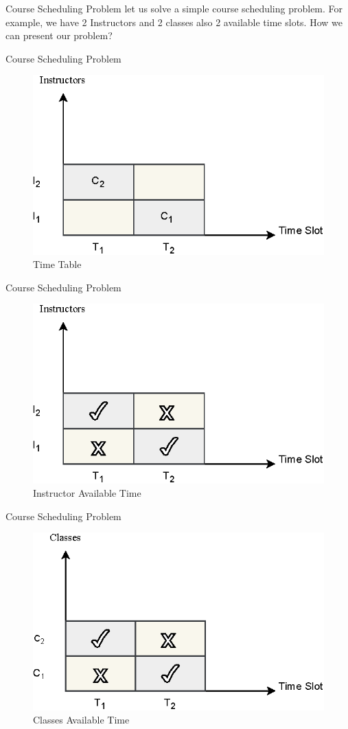 \documentclass[14pt, aspectratio=169]{beamer}
\begin{document}
\begin{frame}{Course Scheduling Problem}
    let us solve a simple course scheduling problem. For example, we have 2 Instructors and 2 classes also 2 available time slots. How we can present our problem?
\end{frame}

\begin{frame}{Course Scheduling Problem}
    \begin{figure}
        \centering
        \includegraphics[width=0.65\linewidth]{Table1.eps}
        \caption{Time Table}
        \label{fig:enter-label}
    \end{figure}
\end{frame}


\begin{frame}{Course Scheduling Problem}
    \begin{figure}
        \centering
        \includegraphics[width=0.65\linewidth]{Table2.eps}
        \caption{Instructor Available Time}
        \label{fig:enter-label}
    \end{figure}
\end{frame}

\begin{frame}{Course Scheduling Problem}
    \begin{figure}
        \centering
        \includegraphics[width=0.65\linewidth]{Classes.eps}
        \caption{Classes Available Time}
        \label{fig:enter-label}
    \end{figure}
\end{frame}
\end{document}
